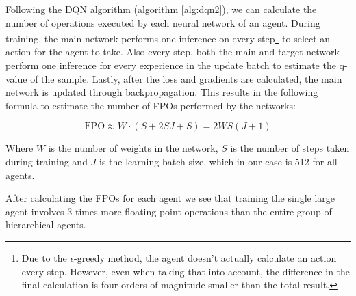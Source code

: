 Following the DQN algorithm (algorithm \ref{alg:dqn2}), we can calculate the number of operations executed by each neural network of an agent. During training, the main network performs one inference on every step\footnote{Due to the $\epsilon$-greedy method, the agent doesn't actually calculate an action every step. However, even when taking that into account, the difference in the final calculation is four orders of magnitude smaller than the total result.} to select an action for the agent to take. Also every step, both the main and target network perform one inference for every experience in the update batch to estimate the q-value of the sample. Lastly, after the loss and gradients are calculated, the main network is updated through backpropagation. This results in the following formula to estimate the number of FPOs performed by the networks:

\begin{equation}
    \mathrm{FPO} \approx W \cdot (S + 2SJ + S) = 2WS(J+1)
\end{equation}

Where $W$ is the number of weights in the network, $S$ is the number of steps taken during training and $J$ is the learning batch size, which in our case is 512 for all agents.

After calculating the FPOs for each agent we see that training the single large agent involves 3 times more floating-point operations than the entire group of hierarchical agents.